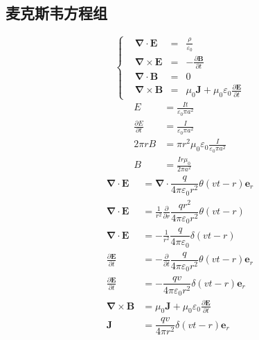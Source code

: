 \subsection{麦克斯韦方程组}
\begin{equation}
    \left\{\begin{aligned}
        &\boldsymbol{\nabla}\cdot\boldsymbol{E}&=&\frac{\rho}{\varepsilon_0}\\
        &\boldsymbol{\nabla}\times\boldsymbol{E}&=&-\frac{\partial \boldsymbol{B}}{\partial t}\\
        &\boldsymbol{\nabla}\cdot\boldsymbol{B}&=&0\\
        &\boldsymbol{\nabla}\times\boldsymbol{B}&=&\mu_0\boldsymbol{J}+\mu_0\varepsilon_0\frac{\partial \boldsymbol{E}}{\partial t}
    \end{aligned}\right.
\end{equation}
\begin{align*}
    E&=\frac{It}{\varepsilon_0\pi a^2}\\
    \frac{\partial E}{\partial t}&=\frac{I}{\varepsilon_0\pi a^2}\\
    2\pi rB&=\pi r^2\mu_0\varepsilon_0\frac{I}{\varepsilon_0\pi a^2}\\
    B&=\frac{Ir\mu_0}{2\pi a^2}
\end{align*}
\begin{align*}
    \boldsymbol{\nabla}\cdot\boldsymbol{E}&=\boldsymbol{\nabla}\cdot\dfrac{q}{4\pi\varepsilon_0r^2}\theta(vt-r)\boldsymbol{e}_r\\
    \boldsymbol{\nabla}\cdot\boldsymbol{E}&=\frac{1}{r^2}\frac{\partial }{\partial r}\dfrac{qr^2}{4\pi\varepsilon_0r^2}\theta(vt-r)\\
    \boldsymbol{\nabla}\cdot\boldsymbol{E}&=-\frac{1}{r^2}\dfrac{q}{4\pi\varepsilon_0}\delta(vt-r)\\
    \frac{\partial \boldsymbol E}{\partial t}&=-\frac{\partial }{\partial t}\dfrac{q}{4\pi\varepsilon_0r^2}\theta(vt-r)\boldsymbol{e}_r\\
    \frac{\partial \boldsymbol E}{\partial t}&=-\dfrac{qv}{4\pi\varepsilon_0r^2}\delta(vt-r)\boldsymbol{e}_r\\
    \boldsymbol{\nabla}\times\boldsymbol{B}&=\mu_0\boldsymbol{J}+\mu_0\varepsilon_0\frac{\partial \boldsymbol{E}}{\partial t}\\
    \boldsymbol{J}&=\dfrac{qv}{4\pi r^2}\delta(vt-r)\boldsymbol{e}_r
\end{align*}

